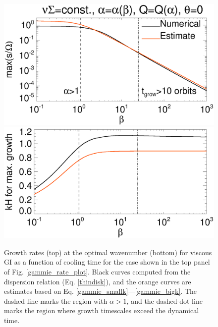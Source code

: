 \begin{figure}
  \includegraphics[width=\linewidth,clip=true,trim=0cm 2cm 0.cm
    0.0cm]{figures/result2d_gvisc}
  \includegraphics[width=\linewidth,clip=true,trim=0cm 0cm 0.cm
    1.0cm]{figures/result2d_gvisc_kmax}
  \caption{Growth rates (top) at the optimal wavenumber (bottom) for
    viscous GI as a function of cooling time for the
    case shown in the top panel of Fig. \ref{gammie_rate_plot}. Black curves 
    computed from the dispersion relation (Eq. \ref{thindisk}), and
    the orange curves are estimates based on
    Eq. \ref{gammie_smallk}---\ref{gammie_bigk}. 
    The dashed
    line marks the region with $\alpha > 1$, and the 
    dashed-dot line marks the region where growth timescales exceed
    the dynamical time.   
    \label{gammie_maxrate_plot}}
\end{figure}
